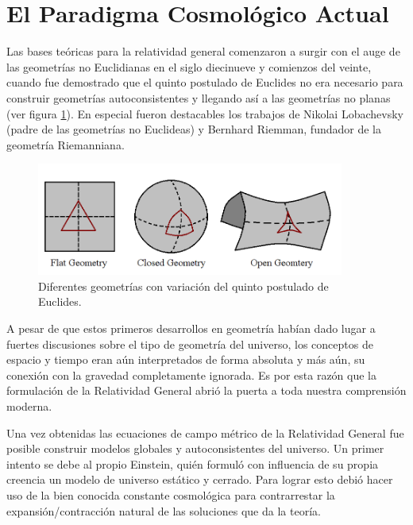 \section{El Paradigma Cosmológico Actual}
\label{sec:TheCurrentCosmologyPicture}


Las bases teóricas para la relatividad general comenzaron a surgir con el 
auge de las geometrías no Euclidianas en el siglo diecinueve y comienzos 
del veinte, cuando fue demostrado que el quinto postulado de Euclides no 
era necesario para construir geometrías autoconsistentes y llegando así a 
las geometrías no planas (ver figura \ref{fig:NonEuclidean}). En especial 
fueron destacables los trabajos de Nikolai Lobachevsky (padre de las 
geometrías no Euclideas) y Bernhard Riemman, fundador de la geometría 
Riemanniana.


\begin{figure}[htbp]
	\centering
	\includegraphics[width=0.9\textwidth]
	{./figures/1_introduction/Non_Euclidean.png}
	
	\caption{\small{Diferentes geometrías con variación del quinto postulado 
	de Euclides.}}
	
	\label{fig:NonEuclidean}
\end{figure}


A pesar de que estos primeros desarrollos en geometría habían dado lugar a
fuertes discusiones sobre el tipo de geometría del universo, los conceptos 
de espacio y tiempo eran aún interpretados de forma absoluta y más aún, su 
conexión con la gravedad completamente ignorada. Es por esta razón que 
la formulación de la Relatividad General abrió la puerta a toda nuestra
comprensión moderna.


Una vez obtenidas las ecuaciones de campo métrico de la Relatividad General
fue posible construir modelos globales y autoconsistentes del universo. Un
primer intento se debe al propio Einstein, quién formuló con influencia 
de su propia creencia un modelo de universo estático y cerrado. Para lograr 
esto debió hacer uso de la bien conocida constante cosmológica para 
contrarrestar la expansión/contracción natural de las soluciones que da
la teoría.


